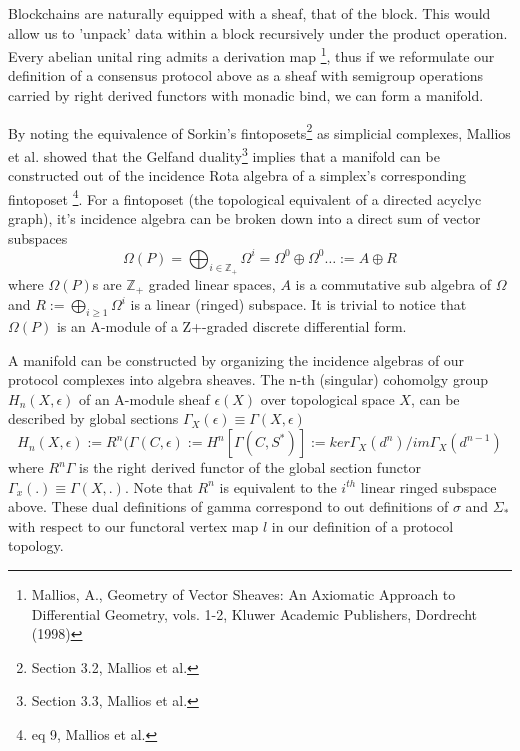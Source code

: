 \documentclass{article}
\begin{document}
Blockchains are naturally equipped with a sheaf, that of the block.  This would allow us to 'unpack' data within a block recursively under the product operation. Every abelian unital ring admits a derivation map \footnote{Mallios, A., Geometry of Vector Sheaves: An Axiomatic Approach to Differential
Geometry, vols. 1-2, Kluwer Academic Publishers, Dordrecht (1998)}, thus if we reformulate our definition of a consensus protocol above as a sheaf with semigroup operations carried by right derived functors with monadic bind, we can form a manifold.

By noting the equivalence of Sorkin's fintoposets\footnote{Section 3.2, Mallios et al.} as simplicial complexes, Mallios et al. showed that the Gelfand duality\footnote{Section 3.3, Mallios et al.} implies that a manifold can be constructed out of the incidence Rota algebra of a simplex's corresponding fintoposet \footnote{eq 9, Mallios et al.}. For a fintoposet (the topological equivalent of a directed acyclyc graph), it's incidence algebra can be broken down into a direct sum of vector subspaces
\begin{equation} \label{eq1}
\Omega(P) = \bigoplus_{i \in \mathbb{Z}_+} \Omega^i = \Omega^0 \oplus \Omega^0 \dots := A \oplus R
\end{equation} \label{eq1}
where $\Omega(P)$s are $\mathbb{Z}_+$ graded linear spaces, $A$ is a commutative sub algebra of $\Omega$ and $R := \bigoplus_{i \geq 1} \Omega^i$ is a linear (ringed) subspace. It is trivial to notice that $\Omega(P)$ is an A-module of a Z+-graded discrete differential form. 

A manifold can be constructed by organizing the incidence algebras of our protocol complexes into algebra sheaves. The n-th (singular) cohomolgy group $H_n(X, \epsilon)$ of an A-module sheaf $\epsilon(X)$ over topological space $X$, can be described by global sections $\Gamma_X(\epsilon) \equiv \Gamma (X, \epsilon)$
\begin{equation} \label{eq1}
H_n(X, \epsilon) := R^n(\Gamma(C,\epsilon) := H^n[\Gamma(C, S^*)] := ker\Gamma_X(d^n)/im\Gamma_X(d^{n-1})
\end{equation} \label{eq1}
where $R^n\Gamma$ is the right derived functor of the global section functor $\Gamma_x(.) \equiv \Gamma(X,.)$. Note that $R^n$ is equivalent to the $i^{th}$ linear ringed subspace above. These dual definitions of gamma correspond to out definitions of $\sigma$ and $\Sigma_*$ with respect to our functoral vertex map $l$ in our definition of a protocol topology.
\end{document}
